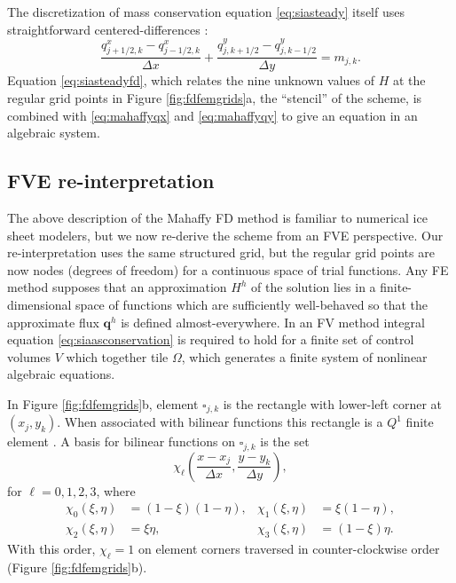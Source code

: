 \documentclass[twocolumn,a4paper]{igs}
\newcommand\bq{\mathbf{q}}
\begin{document}
The discretization of mass conservation equation \eqref{eq:siasteady} itself uses straightforward centered-differences \citep{MortonMayers2005}:
\begin{equation}
\frac{q^x_{j+1/2,k} - q^x_{j-1/2,k}}{\Delta x} + \frac{q^y_{j,k+1/2}- q^y_{j,k-1/2}}{\Delta y} = m_{j,k}.  \label{eq:siasteadyfd}
\end{equation}
Equation \eqref{eq:siasteadyfd}, which relates the nine unknown values of $H$ at the regular grid points in Figure \ref{fig:fdfemgrids}a, the ``stencil'' of the scheme, is combined with \eqref{eq:mahaffyqx} and \eqref{eq:mahaffyqy} to give an equation in an algebraic system.


\subsection{FVE re-interpretation}

The above description of the Mahaffy FD method is familiar to numerical ice sheet modelers, but we now re-derive the scheme from an FVE perspective.  Our re-interpretation uses the same structured grid, but the regular grid points are now nodes (degrees of freedom) for a continuous space of trial functions.  Any FE method supposes that an approximation $H^h$ of the solution lies in a finite-dimensional space of functions which are sufficiently well-behaved so that the approximate flux $\bq^h$ is defined almost-everywhere.  In an FV method integral equation \eqref{eq:siaasconservation} is required to hold for a finite set of control volumes $V$ which together tile $\Omega$, which generates a finite system of nonlinear algebraic equations.

In Figure \ref{fig:fdfemgrids}b, element $\square_{j,k}$ is the rectangle with lower-left corner at $(x_j,y_k)$.  When associated with bilinear functions this rectangle is a $Q^1$ finite element \citep{Elmanetal2005}.  A basis for bilinear functions on $\square_{j,k}$ is the set
\begin{equation}
\chi_\ell \left(\frac{x-x_j}{\Delta x},\frac{y-y_k}{\Delta y}\right), \label{eq:elementbasis}
\end{equation}
for $\ell=0,1,2,3$, where
\begin{align*}
\chi_0(\xi,\eta) &= \left(1-\xi\right) \left(1-\eta\right), & \chi_1(\xi,\eta) &= \xi \left(1-\eta\right), \\
\chi_2(\xi,\eta) &= \xi \eta, & \chi_3(\xi,\eta) &= \left(1-\xi\right) \eta.
\end{align*}
With this order, $\chi_\ell=1$ on element corners traversed in counter-clockwise order (Figure \ref{fig:fdfemgrids}b).  
\end{document}
